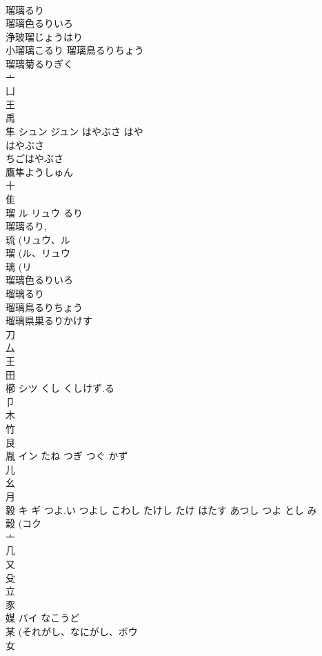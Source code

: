 \documentclass[8pt]{extreport}
\begin{document}
\begin{CJK}{UTF8}{min}
\\	瑠璃るり 
\\	瑠璃色るりいろ 
\\	浄玻瑠じょうはり 
\\	小瑠璃こるり 瑠璃鳥るりちょう 
\\	瑠璃菊るりぎく 
\\	亠 
\\	凵 
\\	王 
\\	禹 
\\	隼	シュン ジュン	はやぶさ はや	
\\	はやぶさ 
\\	ちごはやぶさ 
\\	鷹隼ようしゅん 
\\	十 
\\	隹 
\\	瑠	ル リュウ	るり	
\\	瑠璃るり, 
\\	琉 (リュウ、ル 
\\	瑠 (ル、リュウ 
\\	璃 (リ 
\\	瑠璃色るりいろ 
\\	瑠璃るり 
\\	瑠璃鳥るりちょう 
\\	瑠璃県巣るりかけす 
\\	刀 
\\	厶 
\\	王 
\\	田 
\\	櫛	シツ	くし くしけず.る	
\\	卩 
\\	木 
\\	竹 
\\	艮 
\\	胤	イン	たね つぎ つぐ かず	
\\	儿 
\\	幺 
\\	月 
\\	毅	キ ギ	つよ.い つよし こわし たけし たけ はたす あつし つよ とし み	
\\	穀 (コク 
\\	亠 
\\	几 
\\	又 
\\	殳 
\\	立 
\\	豕 
\\	媒	バイ	なこうど	
\\	某 (それがし、なにがし、ボウ 
\\	女 

\end{CJK}
\end{document}
